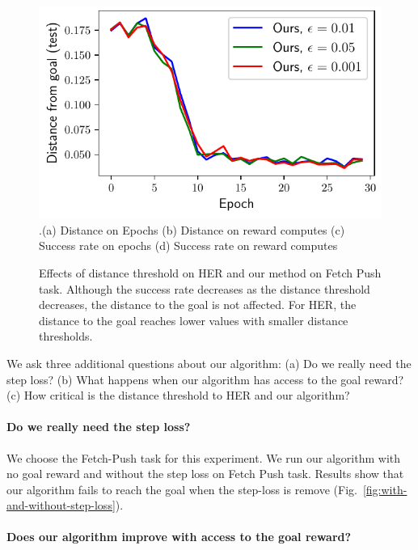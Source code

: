 \begin{figure}
  \includegraphics[width=\frac\columnwidth]{media/res/ablate-ddpg-dqst-low_tresh_chosen-low_thresh_alt-dqst/0.001-FetchPushPR-be467dfepoch-test/ag_g_dist.pdf}%
  {.\tiny\color{blue}\hspace{0.8cm}(a) Distance on Epochs \hspace{1.05cm}(b) Distance on
    reward computes
    \hspace{0.70cm} (c) Success rate on epochs \hspace{0.9cm} (d) Success rate on reward computes}
  \caption{Effects of distance threshold on HER and our method on Fetch Push
task. Although the success rate decreases as the distance threshold decreases,
the distance to the goal is not affected. For HER, the distance to the goal
reaches lower values with smaller distance thresholds.}%
  \label{fig:with-different-distance-thresholds}%
\end{figure}%
% 

We ask three additional questions about our algorithm:
(a) Do we really need the step loss?
(b) What happens when our algorithm has access to the goal reward?
(c) How critical is the distance threshold to HER and our algorithm?
\paragraph{Do we really need the step loss?}
%
We choose the Fetch-Push task for this experiment.
We run our algorithm with no goal reward and without the step loss on Fetch Push
task. Results show that our algorithm fails to reach the goal when the
step-loss is remove (Fig.~\ref{fig:with-and-without-step-loss}).

\paragraph{Does our algorithm improve with access to the goal reward?}

